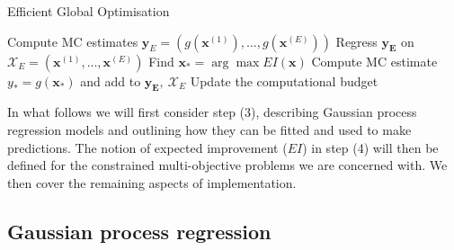 \documentclass{article} %
\begin{document}
\begin{algorithm}
\caption{Efficient Global Optimisation}\label{alg:EGO}
\begin{algorithmic}[1]
\State Compute MC estimates $\mathbf{y}_{E} = (g(\mathbf{x}^{(1)}), \ldots , g(\mathbf{x}^{(E)}))$
\State Regress $\mathbf{y_{E}}$ on $\mathcal{X}_{E} = (\mathbf{x}^{(1)}, \ldots , \mathbf{x}^{(E)})$
\State Find $\mathbf{x}_{*} = \arg\max EI(\mathbf{x})$
\State Compute MC estimate $y_{*} = g(\mathbf{x}_{*})$ and add to $\mathbf{y_{E}},~\mathcal{X}_{E}$
\State Update the computational budget
\EndWhile
\end{algorithmic}
\end{algorithm}

In what follows we will first consider step (3), describing Gaussian process regression models and outlining how they can be fitted and used to make predictions. The notion of expected improvement ($EI$) in step (4) will then be defined for the constrained multi-objective problems we are concerned with. We then cover the remaining aspects of implementation.


\subsection{Gaussian process regression}\label{sec:GP}

\end{document}
